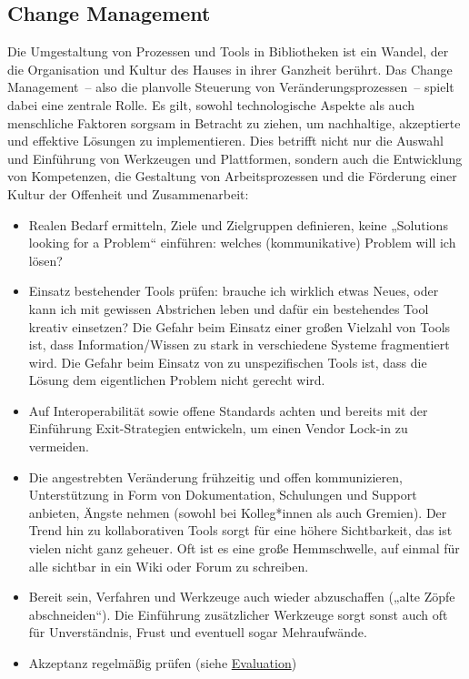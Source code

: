 \documentclass[
  11pt,
  letterpaper,
  DIV=11,
  twoside]{scrreprt}
\begin{document}
\subsection{Change Management}\label{change-management}

Die Umgestaltung von Prozessen und Tools in Bibliotheken ist ein Wandel,
der die Organisation und Kultur des Hauses in ihrer Ganzheit berührt.
Das Change Management~-- also die planvolle Steuerung von
Veränderungsprozessen~-- spielt dabei eine zentrale Rolle. Es gilt,
sowohl technologische Aspekte als auch menschliche Faktoren sorgsam in
Betracht zu ziehen, um nachhaltige, akzeptierte und effektive Lösungen
zu implementieren. Dies betrifft nicht nur die Auswahl und Einführung
von Werkzeugen und Plattformen, sondern auch die Entwicklung von
Kompetenzen, die Gestaltung von Arbeitsprozessen und die Förderung einer
Kultur der Offenheit und Zusammenarbeit:

\begin{itemize}
\item
  Realen Bedarf ermitteln, Ziele und Zielgruppen definieren, keine
  „Solutions looking for a Problem`` einführen: welches (kommunikative)
  Problem will ich lösen?
\item
  Einsatz bestehender Tools prüfen: brauche ich wirklich etwas Neues,
  oder kann ich mit gewissen Abstrichen leben und dafür ein bestehendes
  Tool kreativ einsetzen? Die Gefahr beim Einsatz einer großen Vielzahl
  von Tools ist, dass Information/Wissen zu stark in verschiedene
  Systeme fragmentiert wird. Die Gefahr beim Einsatz von zu
  unspezifischen Tools ist, dass die Lösung dem eigentlichen Problem
  nicht gerecht wird.
\item
  Auf Interoperabilität sowie offene Standards achten und bereits mit
  der Einführung Exit-Strategien entwickeln, um einen Vendor Lock-in zu
  vermeiden.
\item
  Die angestrebten Veränderung frühzeitig und offen kommunizieren,
  Unterstützung in Form von Dokumentation, Schulungen und Support
  anbieten, Ängste nehmen (sowohl bei Kolleg*innen als auch Gremien).
  Der Trend hin zu kollaborativen Tools sorgt für eine höhere
  Sichtbarkeit, das ist vielen nicht ganz geheuer. Oft ist es eine große
  Hemmschwelle, auf einmal für alle sichtbar in ein Wiki oder Forum zu
  schreiben.
\item
  Bereit sein, Verfahren und Werkzeuge auch wieder abzuschaffen („alte
  Zöpfe abschneiden``). Die Einführung zusätzlicher Werkzeuge sorgt
  sonst auch oft für Unverständnis, Frust und eventuell sogar
  Mehraufwände.
\item
  Akzeptanz regelmäßig prüfen (siehe \hyperref[evaluation]{Evaluation})
\end{itemize}
\end{document}
